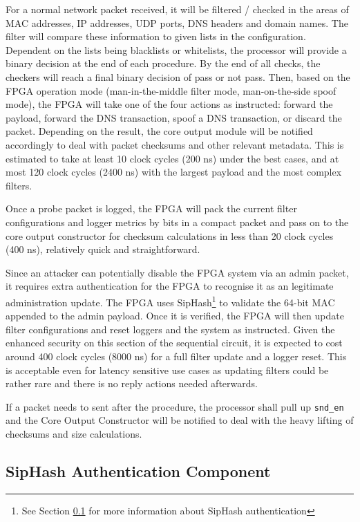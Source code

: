 \documentclass[a4paper]{report}
\newcommand{\code}{\texttt}
\begin{document}
For a normal network packet received, it will be filtered / checked in the areas of MAC addresses, IP addresses, UDP ports, DNS headers and domain names. The filter will compare these information to given lists in the configuration. Dependent on the lists being blacklists or whitelists, the processor will provide a binary decision at the end of each procedure. By the end of all checks, the checkers will reach a final binary decision of pass or not pass. Then, based on the FPGA operation mode (man-in-the-middle filter mode, man-on-the-side spoof mode), the FPGA will take one of the four actions as instructed: forward the payload, forward the DNS transaction, spoof a DNS transaction, or discard the packet. Depending on the result, the core output module will be notified accordingly to deal with packet checksums and other relevant metadata. This is estimated to take at least 10 clock cycles (200 ns) under the best cases, and at most 120 clock cycles (2400 ns) with the largest payload and the most complex filters.  

Once a probe packet is logged, the FPGA will pack the current filter configurations and logger metrics by bits in a compact packet and pass on to the core output constructor for checksum calculations in less than 20 clock cycles (400 ns), relatively quick and straightforward.

Since an attacker can potentially disable the FPGA system via an admin packet, it requires extra authentication for the FPGA to recognise it as an legitimate administration update. The FPGA uses SipHash\footnote{See Section \ref{section:implementation-hardware-implementation-siphash} for more information about SipHash authentication} to validate the 64-bit MAC appended to the admin payload. Once it is verified, the FPGA will then update filter configurations and reset loggers and the system as instructed. Given the enhanced security on this section of the sequential circuit, it is expected to cost around 400 clock cycles (8000 ns) for a full filter update and a logger reset. This is acceptable even for latency sensitive use cases as updating filters could be rather rare and there is no reply actions needed afterwards.

If a packet needs to sent after the procedure, the processor shall pull up \code{snd\_en} and the Core Output Constructor will be notified to deal with the heavy lifting of checksums and size calculations.

\subsection{SipHash Authentication Component}
\label{section:implementation-hardware-implementation-siphash}
\end{document}
